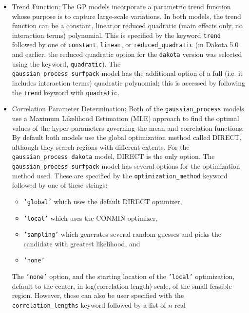\begin{itemize}
\item Trend Function:  The GP models incorporate a parametric trend 
      function whose purpose is to capture large-scale variations. In 
      both models, the trend function can be a constant, linear,or 
      reduced quadratic (main effects only, no interaction terms) 
      polynomial.  This is specified by the keyword \texttt{trend}
      followed by one of \texttt{constant}, \texttt{linear}, or 
      \texttt{reduced\_quadratic} (in Dakota 5.0 and earlier, the reduced 
      quadratic option for the \texttt{dakota} version was selected using 
      the keyword, \texttt{quadratic}). The \\
      \texttt{gaussian\_process surfpack} model has the additional option 
      of a full (i.e. it includes interaction terms) quadratic polynomial; 
      this is accessed by following the \texttt{trend} keyword with 
      \texttt{quadratic}.
\item Correlation Parameter Determination: Both of the 
      \texttt{gaussian\_process} models use a Maximum Likelihood Estimation 
      (MLE) approach to find the optimal values of the hyper-parameters 
      governing the mean and correlation functions. By default both models 
      use the global optimization method called DIRECT, although they search 
      regions with different extents. For the 
      \texttt{gaussian\_process dakota} model, DIRECT is the only option.  
      The \texttt{gaussian\_process surfpack} model has several options for 
      the optimization method used.  These are specified by the 
      \texttt{optimization\_method} keyword followed by one of these strings:
      \begin{itemize}
      \item \texttt{'global'} which uses the default DIRECT optimizer,
      \item \texttt{'local'} which uses the CONMIN optimizer,
      \item \texttt{'sampling'} which generates several random guesses and 
            picks the candidate with greatest likelihood, and
      \item \texttt{'none'} 
      \end{itemize} 
      The \texttt{'none'} option, and the starting location of the 
      \texttt{'local'} optimization, default to the center, in 
      log(correlation length) scale, of the small feasible region.  
      However, these can also be user specified with the 
      \texttt{correlation\_lengths} keyword followed by a list of $n$ real 

\end{itemize}
